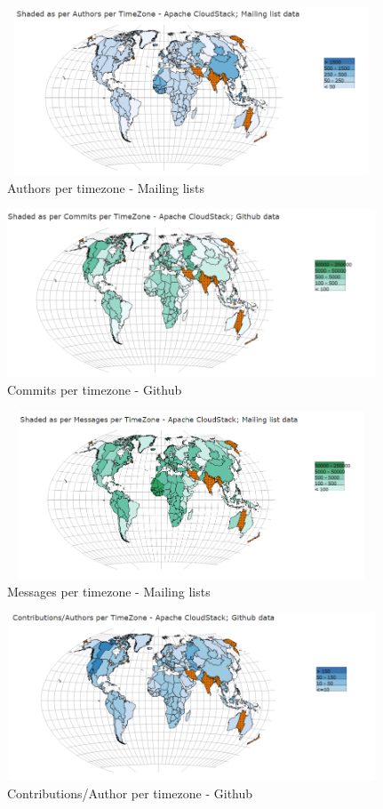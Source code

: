 \documentclass[double,12pt]{beavtex}
\begin{document}
\begin{figure}[!ht]
\centering
\includegraphics[width=110mm,height=50mm]{image5.PNG}
\caption{Authors per timezone - Mailing lists}
\end{figure}

\begin{figure}[!ht]
\centering
\includegraphics[width=110mm,height=50mm]{image6.PNG}
\caption{Commits per timezone - Github}
\end{figure}

\begin{figure}[!ht]
\centering
\includegraphics[width=110mm,height=50mm]{image7.PNG}
\caption{Messages per timezone - Mailing lists}
\end{figure}

\begin{figure}[!ht]
\centering
\includegraphics[width=110mm,height=50mm]{image8.PNG}
\caption{Contributions/Author per timezone - Github}
\end{figure}
\end{document}
